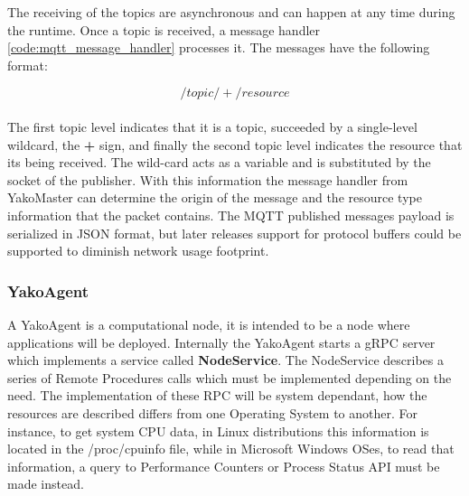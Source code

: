             The receiving of the topics are asynchronous and can happen at any time during the runtime. Once a topic is received, a message handler \ref{code:mqtt_message_handler} processes it. The messages have the following format:
            
            \[     \boxed{/topic/+/resource}    \]\\
            
            The first topic level indicates that it is a topic, succeeded by a single-level wildcard, the \textbf{+} sign, and finally the second topic level indicates the resource that its being received. The wild-card acts as a variable and is substituted by the socket of the publisher.
            With this information the message handler from YakoMaster can determine the origin of the message and the resource type information that the packet contains.
            The MQTT published messages payload is serialized in JSON format, but later releases support for protocol buffers could be supported to diminish network usage footprint.
        
    
    \subsubsection{YakoAgent} \label{yakoagent}
        A YakoAgent is a computational node, it is intended to be a node where applications will be deployed. Internally the YakoAgent starts a gRPC server which implements a service called \textbf{NodeService}. The NodeService describes a series of Remote Procedures calls which must be implemented depending on the need. The implementation of these RPC will be system dependant, how the resources are described differs from one Operating System to another. For instance, to get system CPU data, in Linux distributions this information is located in the /proc/cpuinfo file, while in Microsoft Windows OSes, to read that information, a query to Performance Counters \cite{karl-bridge-microsoft_performance_nodate} or Process Status API \cite{karl-bridge-microsoft_process_nodate} must be made instead.
        
